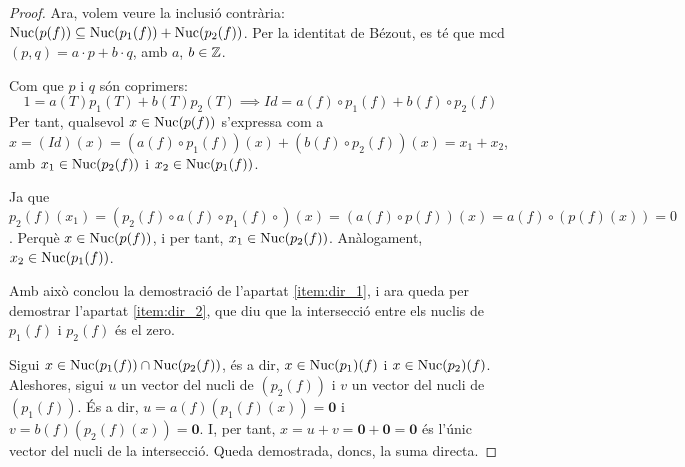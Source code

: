\begin{proof}
Ara, volem veure la inclusió contrària: $\operatorname{Nuc}(p(f)) \subseteq  \operatorname{Nuc}(p_1(f)) + \operatorname{Nuc}(p_2(f))$. Per la identitat de Bézout, es té que mcd$(p, q) = a \cdot p + b \cdot q$, amb $a$, $b \in \mathbb{Z}$.

Com que $p$ i $q$ són coprimers:
$$1 = a(T)p_1(T) + b(T)p_2(T) \implies Id = a(f) \circ p_1(f) + b(f) \circ p_2(f)$$
Per tant, qualsevol $x \in \operatorname{Nuc}(p(f))$ s'expressa com a $x = (Id)(x) = (a(f)\circ p_1(f))(x) + (b(f)\circ p_2(f))(x) = x_1 + x_2$, amb $x_1 \in \operatorname{Nuc}(p_2(f))$ i $x_2 \in \operatorname{Nuc}(p_1(f))$.

Ja que $p_2(f)(x_1) = (p_2(f)\circ a(f)\circ p_1(f)\circ)(x) = (a(f)\circ p(f))(x) = a(f)\circ (p(f)(x)) = 0$. Perquè $x \in \operatorname{Nuc}(p(f))$, i per tant, $x_1 \in \operatorname{Nuc}(p_2(f))$. Anàlogament, $x_2 \in \operatorname{Nuc}(p_1(f))$.

Amb això conclou la demostració de l'apartat \eqref{item:dir_1}, i ara queda per demostrar l'apartat \eqref{item:dir_2}, que diu que la intersecció entre els nuclis de $p_1(f)$ i $p_2(f)$ és el zero.

Sigui $x \in \operatorname{Nuc}(p_1(f)) \cap \operatorname{Nuc}(p_2(f))$, és a dir, $x \in \operatorname{Nuc}(p_1)(f)$ i $x \in \operatorname{Nuc}(p_2)(f)$. Aleshores, sigui $u$ un vector del nucli de $(p_2(f))$ i $v$ un vector del nucli de $(p_1(f))$. És a dir, ${u} = a(f)(p_1(f)(x)) = \mathbf{0}$ i ${v} = b(f)(p_2(f)(x)) = \mathbf{0}$. I, per tant, ${x} = {u} + {v} = \mathbf{0} + \mathbf{0} = \mathbf{0}$ és l'únic vector del nucli de la intersecció.
Queda demostrada, doncs, la suma directa.
\end{proof}
